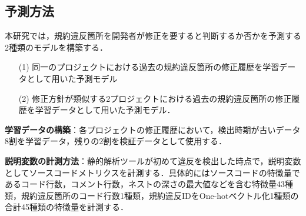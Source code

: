 \documentclass[uplatex,dvipdfmx,a4paper,twocolumn,base=10.5pt,jbase=10.5pt,ja=standard]{bxjsarticle}  %
\begin{document}



\vspace{2mm}
\subsection{予測方法}
\vspace{2mm}
本研究では，規約違反箇所を開発者が修正を要すると判断するか否かを予測する2種類のモデルを構築する．\\
\vspace{-6mm}
\begin{itemize}
\item[(1)] 同一のプロジェクトにおける過去の規約違反箇所の修正履歴を学習データとして用いた予測モデル\\\vspace{-4mm}
\item[(2)] 修正方針が類似する2プロジェクトにおける過去の規約違反箇所の修正履歴を学習データとして用いた予測モデル．
\end{itemize}
\vspace{-2mm}

\noindent\textbf{学習データの構築}：各プロジェクトの修正履歴において，検出時期が古いデータ8割を学習データ，残りの2割を検証データとして使用する．

\noindent\textbf{説明変数の計測方法}：静的解析ツールが初めて違反を検出した時点で，説明変数としてソースコードメトリクスを計測する．具体的にはソースコードの特徴量であるコード行数，コメント行数，ネストの深さの最大値などを含む特徴量43種類，規約違反箇所のコード行数1種類，規約違反IDをOne-hotベクトル化1種類の合計45種類の特徴量を計測する．
\end{document}
